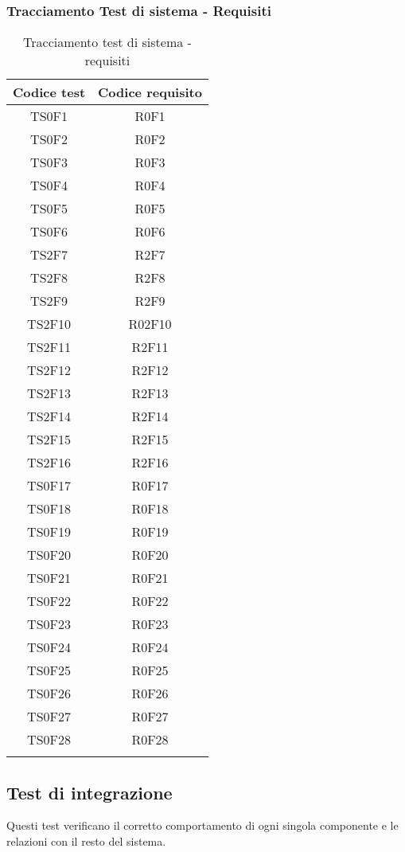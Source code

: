 \subsubsection{Tracciamento Test di sistema - Requisiti}
\normalsize
\begin{longtable}{|c|c|}
	\hline
	\textbf{Codice test} & \textbf{Codice requisito} \\
	\hline
	\endhead
	TS0F1 & R0F1\\
	\hline
	TS0F2 & R0F2\\
	\hline
	TS0F3 & R0F3\\
	\hline
	TS0F4 & R0F4\\
	\hline
	TS0F5 & R0F5\\
	\hline
	TS0F6 & R0F6\\
	\hline
	TS2F7 & R2F7\\
	\hline
	TS2F8 & R2F8\\
	\hline
	TS2F9 & R2F9\\
	\hline
	TS2F10 & R02F10\\
	\hline
	TS2F11 & R2F11\\
	\hline
	TS2F12 & R2F12\\
	\hline
	TS2F13 & R2F13\\
	\hline
	TS2F14 & R2F14\\
	\hline
	TS2F15 & R2F15\\
	\hline
	TS2F16 & R2F16\\
	\hline
	TS0F17 & R0F17\\
	\hline
	TS0F18 & R0F18\\
	\hline
	TS0F19 & R0F19\\
	\hline
	TS0F20 & R0F20\\
	\hline
	TS0F21 & R0F21\\
	\hline
	TS0F22 & R0F22\\
	\hline
	TS0F23 & R0F23\\
	\hline
	TS0F24 & R0F24\\
	\hline
	TS0F25 & R0F25\\
	\hline
	TS0F26 & R0F26\\
	\hline
	TS0F27 & R0F27\\
	\hline
	TS0F28 & R0F28\\
	\hline
	\caption[Tracciamento test di sistema - requisiti]{Tracciamento test di sistema - requisiti}
\end{longtable}
\clearpage

\subsection{Test di integrazione}
Questi test verificano il corretto comportamento di ogni singola componente e le relazioni con il resto del sistema.

